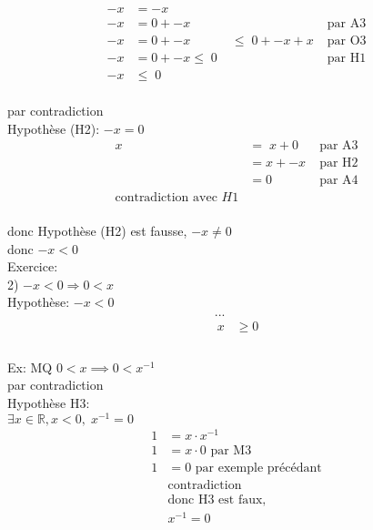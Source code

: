 \documentclass{article}
\newcommand{\reals}{\mathbb{R}}
\begin{document}
\begin{equation}
\begin{aligned}
    -x &=  -x\\
    -x &=  0 + -x &\;         & \text{par A3} \\
    -x &=  0 + -x &\le \; 0 + -x + x\; &\text{par O3} \\
    -x &=  0 + -x \le \; 0 \;  &     & \text{par H1} \\
    -x &\le \; 0 \;  &     & \text{} \\
\end{aligned}
\end{equation}

par contradiction \\
Hypothèse (H2): $ -x = 0 $ \\
\begin{equation}
\begin{aligned}
    x &= \; x + 0 \; & \text{par A3} \\
    &= x + -x \; &\text{par H2} \\
    &= 0 \; &\text{par A4} \\
    \text{contradiction avec } H1
\end{aligned}
\end{equation}\\

donc Hypothèse (H2) est fausse, $-x \ne 0$ \\
donc $-x < 0$ \\

Exercice: \\
2) $-x < 0 \Longrightarrow 0 < x$ \\
Hypothèse: $-x < 0$ \\

\begin{equation}
\begin{aligned}
    ...\\\
    x &\ge 0 \\
\end{aligned}
\end{equation}\\
Ex: MQ $0 < x \implies 0 < x^{-1}$\\
par contradiction\\
Hypothèse H3:\\
$\exists x \in \reals, x < 0, \; x^{-1} = 0 $\\
\begin{equation}
\begin{aligned}
    1 &= x \cdot x^{-1} \\
    1 &= x \cdot 0 \text{ par M3} \\
    1 &= 0 \text{ par exemple précédant} \\
    &\text{contradiction} \\
    &\text{donc H3 est faux}, \\
    &x^{-1} = 0 \\
\end{aligned}
\end{equation}\\
\end{document}
